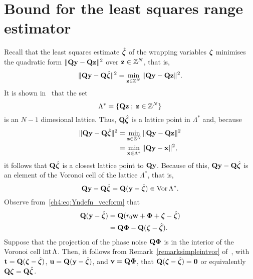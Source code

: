 \section{Bound for the least squares range estimator}\label{ch4:sec:robustness-bound}

Recall that the least squares estimate $\hat{\boldsymbol{\zeta}}$ of the wrapping variables $\boldsymbol{\zeta}$ minimises the quadratic form $\|\mathbf{Q} \mathbf{y} - \mathbf{Q} \mathbf{z}\|^2$ over $\mathbf{z} \in {\mathbb Z}^N$, that is,
\[
\|\mathbf{Q} \mathbf{y} - \mathbf{Q} \hat{\boldsymbol{\zeta}}\|^2 = \min_{\mathbf{z} \in {\mathbb Z}^N} \|\mathbf{Q} \mathbf{y} - \mathbf{Q} \mathbf{z}\|^2.
\]
It is shown in~ that the set
\[
\Lambda^* = \{ \mathbf{Q}\mathbf{z} \; ; \; \mathbf{z} \in {\mathbb Z}^N  \}
\]
is an $N-1$ dimesional lattice.  Thus, $\mathbf{Q}\hat{\boldsymbol{\zeta}}$ is a lattice point in $\Lambda^*$ and, because 
\begin{align*}
\|\mathbf{Q} \mathbf{y} - \mathbf{Q} \hat{\boldsymbol{\zeta}}\|^2 &= \min_{\mathbf{z} \in {\mathbb Z}^N} \|\mathbf{Q} \mathbf{y} -  \mathbf{Q} \mathbf{z}\|^2 \\
&= \min_{\mathbf{x} \in \Lambda^*} \|\mathbf{Q} \mathbf{y} - \mathbf{x}\|^2,
\end{align*}
it follows that $\mathbf{Q} \hat{\boldsymbol{\zeta}}$ is a closest lattice point to $\mathbf{Q}\mathbf{y}$.  Because of this, $\mathbf{Q} \mathbf{y} - \mathbf{Q} \hat{\boldsymbol{\zeta}}$ is an element of the Voronoi cell of the lattice $\Lambda^*$, that is,
\[
\mathbf{Q} \mathbf{y} - \mathbf{Q} \hat{\boldsymbol{\zeta}} = \mathbf{Q} ( \mathbf{y} -  \hat{\boldsymbol{\zeta}} ) \in \operatorname{Vor} \Lambda^*.
\]
Observe from~\ref{ch4:eq:Yndefn_vecform} that
\begin{align*}
\mathbf{Q} (\mathbf{y} - \hat{\boldsymbol{\zeta}}) &= \mathbf{Q} (r_0\mathbf{w} + \boldsymbol{\Phi} + \boldsymbol{\zeta} - \hat{\boldsymbol{\zeta}}) \\
&= \mathbf{Q} \boldsymbol{\Phi} - \mathbf{Q}(\boldsymbol{\zeta} - \hat{\boldsymbol{\zeta}}).
\end{align*}
Suppose that the projection of the phase noise $\mathbf{Q} \boldsymbol{\Phi}$ is in the interior of the Voronoi cell $\operatorname{int} \Lambda$.  Then, it follows from Remark~\ref{remarksimpleintvor} of~, with $\mathbf{t} = \mathbf{Q}(\boldsymbol{\zeta} - \hat{\boldsymbol{\zeta}})$, $\mathbf{u} = \mathbf{Q} (\mathbf{y} - \hat{\boldsymbol{\zeta}})$, and $\mathbf{v} = \mathbf{Q} \boldsymbol{\Phi}$, that $\mathbf{Q}(\boldsymbol{\zeta} - \hat{\boldsymbol{\zeta}}) = \boldsymbol{0}$ or equivalently $\mathbf{Q}\boldsymbol{\zeta} =\mathbf{Q}\hat{\boldsymbol{\zeta}}$.

